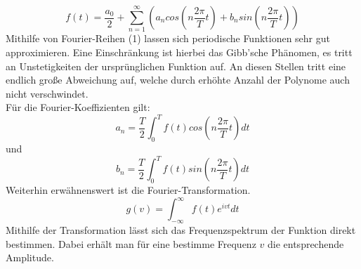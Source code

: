 \begin{equation} 
f(t) = \frac{a_0}{2} + \sum_{n=1}^\infty (a_n cos(n\frac{2\pi}{T}t) + b_n sin(n\frac{2\pi}{T}t)) 
\end{equation}
Mithilfe von Fourier-Reihen (1) lassen sich periodische Funktionen sehr gut approximieren. Eine Einschränkung ist hierbei das Gibb'sche Phänomen, es tritt an Unstetigkeiten der ursprünglichen Funktion auf. An diesen Stellen tritt eine endlich große Abweichung auf, welche durch erhöhte Anzahl der Polynome auch nicht verschwindet. \\
Für die Fourier-Koeffizienten gilt:
\begin{equation}
a_n = \frac{T}{2}\int_{0}^{T} f(t) cos(n\frac{2\pi}{T}t) dt
\end{equation}
und
\begin{equation}
b_n = \frac{T}{2}\int_{0}^{T} f(t) sin(n\frac{2\pi}{T}t) dt
\end{equation}
Weiterhin erwähnenswert ist die Fourier-Transformation.
\begin{equation}
g(v) = \int_{-\infty}^{\infty} f(t) e^{ivt} dt
\end{equation}
Mithilfe der Transformation lässt sich das Frequenzspektrum der Funktion direkt bestimmen. Dabei erhält man für eine bestimme Frequenz $v$ die entsprechende Amplitude.
